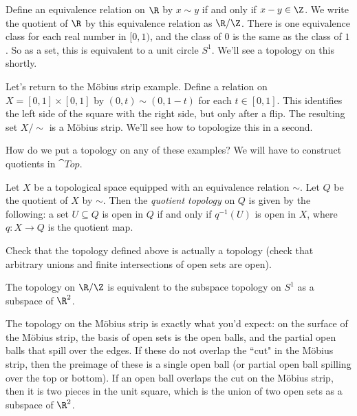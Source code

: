 \documentclass[noname]{notes}
\begin{document}
\begin{example}
	Define an equivalence relation on $\R$ by $x \sim y$ if and only if $x - y \in \Z$. We write the quotient of $\R$ by this equivalence relation as $\R /\Z$. There is one equivalence class for each real number in $[0,1)$, and the class of $0$ is the same as the class of $1$. So as a set, this is equivalent to a unit circle $S^1$. We'll see a topology on this shortly. 
\end{example}

\begin{example}
	Let's return to the M\"obius strip example. Define a relation on $X = [0,1] \times [0,1]$ by $(0,t) \sim (0,1-t)$ for each $t \in [0,1]$. This identifies the left side of the square with the right side, but only after a flip. The resulting set $X/\!\!\sim$ is a M\"obius strip. We'll see how to topologize this in a second. 
\end{example}

How do we put a topology on any of these examples? We will have to construct quotients in $\cat{Top}$.

\begin{definition}
	Let $X$ be a topological space equipped with an equivalence relation $\sim$. Let $Q$ be the quotient of $X$ by $\sim$. Then the \emph{quotient topology} on $Q$ is given by the following: a set $U \subseteq Q$ is open in $Q$ if and only if $q^{-1}(U)$ is open in $X$, where $q \colon X \to Q$ is the quotient map. 
\end{definition}

\begin{exercise}
	Check that the topology defined above is actually a topology (check that arbitrary unions and finite intersections of open sets are open). 
\end{exercise}

\begin{example}
	The topology on $\R/\Z$ is equivalent to the subspace topology on $S^1$ as a subspace of $\R^2$. 
\end{example}

\begin{example}
	The topology on the M\"obius strip is exactly what you'd expect: on the surface of the M\"obius strip, the basis of open sets is the open balls, and the partial open balls that spill over the edges. If these do not overlap the ``cut" in the M\"obius strip, then the preimage of these is a single open ball (or partial open ball spilling over the top or bottom). If an open ball overlaps the cut on the M\"obius strip, then it is two pieces in the unit square, which is the union of two open sets as a subspace of $\R^2$. 
\end{example}
\end{document}

